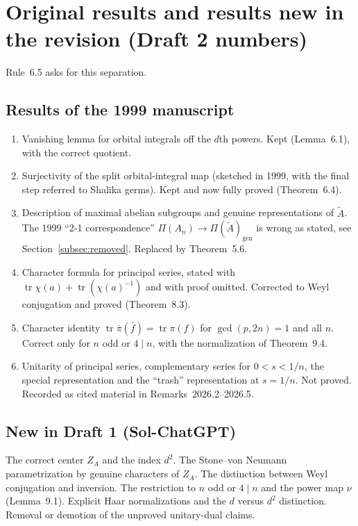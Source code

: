 \documentclass[12pt,letterpaper]{article}
\newcommand{\At}{\widetilde A}
\newcommand{\ZA}{Z_A}
\DeclareMathOperator{\tr}{tr}
\begin{document}
\section{Original results and results new in the revision (Draft 2 numbers)}\label{sec:orig2}

Rule~6.5 asks for this separation.

\subsection{Results of the 1999 manuscript}
\begin{enumerate}[leftmargin=*]
\item Vanishing lemma for orbital integrals off the $d$th powers. Kept
  (Lemma~6.1), with the correct quotient.
\item Surjectivity of the split orbital-integral map (sketched in 1999,
  with the final step referred to Shalika germs). Kept and now fully
  proved (Theorem~6.4).
\item Description of maximal abelian subgroups and genuine
  representations of $\At$. The 1999 ``2-1 correspondence''
  $\Pi(A_n)\to\Pi(\At)_{\mathrm{gen}}$ is wrong as stated, see
  Section~\ref{subsec:removed}. Replaced by Theorem~5.6.
\item Character formula for principal series, stated with
  $\tr\chi(a)+\tr(\chi(a)^{-1})$ and with proof omitted. Corrected to
  Weyl conjugation and proved (Theorem~8.3).
\item Character identity $\tr\overline\pi(\bar f)=\tr\pi(f)$ for
  $\gcd(p,2n)=1$ and all $n$. Correct only for $n$ odd or $4\mid n$,
  with the normalization of Theorem~9.4.
\item Unitarity of principal series, complementary series for
  $0<s<1/n$, the special representation and the ``trash''
  representation at $s=1/n$. Not proved. Recorded as cited material in
  Remarks~2026.2--2026.5.
\end{enumerate}

\subsection{New in Draft 1 (Sol-ChatGPT)}
The correct center $\ZA$ and the index $d^2$. The Stone--von Neumann
parametrization by genuine characters of $\ZA$. The distinction between
Weyl conjugation and inversion. The restriction to $n$ odd or $4\mid n$
and the power map $\nu$ (Lemma~9.1). Explicit Haar normalizations and
the $d$ versus $d^2$ distinction. Removal or demotion of the unproved
unitary-dual claims.
\end{document}
